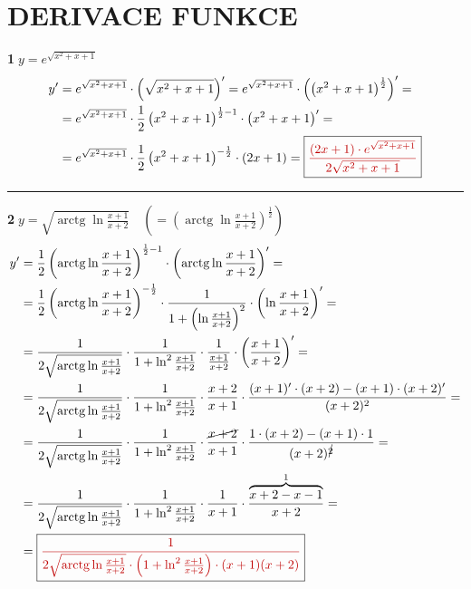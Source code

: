 \documentclass[11pt,a4paper]{article}
\newcommand{\vysl}[1]{\boxed{\color{red!75!black}#1}}
\DeclareMathOperator{\arctg}{arctg}
\begin{document}
\section*{DERIVACE FUNKCE}

\newcommand{\lnf}{\ln\frac{x+1}{x+2}}

\textbf{\textcircled{1}}\quad $y=e^{\sqrt{x^2+x+1}}$
\begin{align*}
y' &= e^{\sqrt{x^2+x+1}}\cdot\left(\sqrt{x^2+x+1}\right)' = e^{\sqrt{x^2+x+1}}\cdot\left(\left(x^2+x+1\right)^{\frac12}\right)' =\\
&= e^{\sqrt{x^2+x+1}}\cdot\frac12\left(x^2+x+1\right)^{\frac12-1}\cdot\left(x^2+x+1\right)' =\\
&= e^{\sqrt{x^2+x+1}}\cdot\frac12\left(x^2+x+1\right)^{-\frac12}\cdot(2x+1) = \vysl{\frac{(2x+1)\cdot e^{\sqrt{x^2+x+1}}}{2\sqrt{x^2+x+1}}}
\end{align*}

\hrule
\medskip
\textbf{\textcircled{2}}\quad $y=\sqrt{\arctg\lnf}\quad\left(=\left(\arctg\lnf\right)^{\frac12}\right)$
\begin{align*}
y' &= \frac12\left(\arctg\lnf\right)^{\frac12-1}\cdot\left(\arctg\lnf\right)' =\\
&= \frac12\left(\arctg\lnf\right)^{-\frac12}\cdot\frac{1}{1+\left(\lnf\right)^2}\cdot\left(\lnf\right)' =\\
&= \frac{1}{2\sqrt{\arctg\lnf}}\cdot\frac{1}{1+\ln^2\frac{x+1}{x+2}}\cdot\frac{1}{\frac{x+1}{x+2}}\cdot\left(\frac{x+1}{x+2}\right)' =\\
&= \frac{1}{2\sqrt{\arctg\lnf}}\cdot\frac{1}{1+\ln^2\frac{x+1}{x+2}}\cdot\frac{x+2}{x+1}\cdot\frac{(x+1)'\cdot(x+2)-(x+1)\cdot(x+2)'}{(x+2)^2} =\\
&= \frac{1}{2\sqrt{\arctg\lnf}}\cdot\frac{1}{1+\ln^2\frac{x+1}{x+2}}\cdot\frac{\cancel{x+2}}{x+1}\cdot\frac{1\cdot(x+2)-(x+1)\cdot1}{(x+2)^{\cancel{2}}} =\\
&= \frac{1}{2\sqrt{\arctg\lnf}}\cdot\frac{1}{1+\ln^2\frac{x+1}{x+2}}\cdot\frac{1}{x+1}\cdot\frac{\overbrace{x+2-x-1}^{1}}{x+2} =\\
&= \vysl{\frac{1}{2\sqrt{\arctg\lnf}\cdot\left(1+\ln^2\frac{x+1}{x+2}\right)\cdot(x+1)(x+2)}}
\end{align*}
\end{document}
